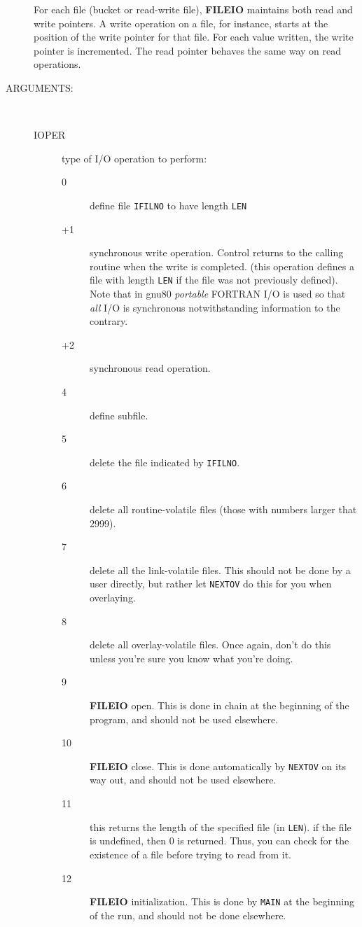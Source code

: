 \begin{description}
For each file (bucket or read-write  file),  {\bf FILEIO}  
maintains  both  read  and  write pointers.  A write operation on a
file, for instance, starts at the position of the write pointer
for  that  file.   For each value written, the write pointer is
incremented.  The read pointer behaves the same way on read operations.
\item[ARGUMENTS:] \ \\
\begin{description}
\item[IOPER]   type of I/O operation to perform:
\begin{description} 
\item[0] define file   {\tt IFILNO}  to have length  {\tt LEN}   
\item[+1]  synchronous write operation. Control   returns  to  the
calling routine when the write is completed.
(this operation defines a file with length {\tt LEN} if the file
was not previously defined). Note that in gnu80 {\em portable}
FORTRAN I/O is used so that {\em all } I/O is synchronous notwithstanding
information to the contrary.
\item[+2]  synchronous read operation.
\item[4]  define subfile.
\item[5]  delete the file indicated by {\tt IFILNO}.
\item[6]  delete all routine-volatile files (those  with  numbers
larger that 2999).
\item[7]  delete all the link-volatile files.  This should  not
be done by a user directly, but rather let {\tt NEXTOV} do this
for you when overlaying.
\item[8]  delete all overlay-volatile files.  Once again, don't do
this unless you're sure you know what you're doing.
\item[9]  {\bf FILEIO} open.  This is done in chain at the beginning of
the program, and should not be used elsewhere.
\item[10]  {\bf FILEIO} close.  This is done automatically by {\tt NEXTOV} on
its way out, and should not be used elsewhere.
\item[11]  this returns the length of the specified file (in {\tt LEN}).
if the file is undefined, then 0 is returned.  Thus,
you can check for the existence of a file before trying
to read from it.
\item[12]  {\bf FILEIO} initialization. This is done by {\tt MAIN} at the
beginning of the run, and should not be done elsewhere.
\end{description}

\end{description}
\end{description}
